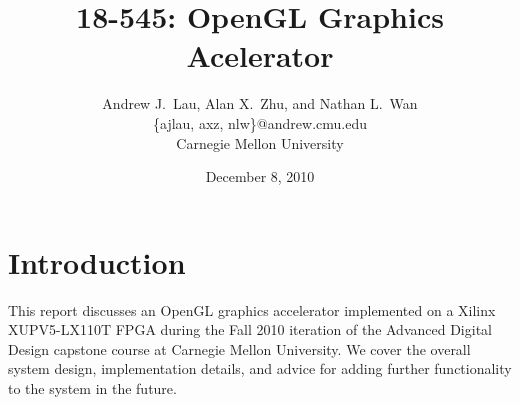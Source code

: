 \documentclass[letterpaper,10pt]{article}
\begin{document}

\title{\Large \bf 18-545: OpenGL Graphics Acelerator}
\author{
{\rm Andrew J.\ Lau, Alan X.\ Zhu, and Nathan L.\ Wan}\\
\{ajlau, axz, nlw\}@andrew.cmu.edu\\
Carnegie Mellon University
} %

\date{December 8, 2010}

\maketitle
\newpage
\tableofcontents
\listoffigures
\listoftables
\newpage
\thispagestyle{empty}

\section{Introduction}
This report discusses an OpenGL graphics accelerator implemented on a Xilinx XUPV5-LX110T FPGA during the Fall 2010 iteration of the Advanced Digital Design capstone course at Carnegie Mellon University. We cover the overall system design, implementation details, and advice for adding further functionality to the system in the future.
\end{document}
